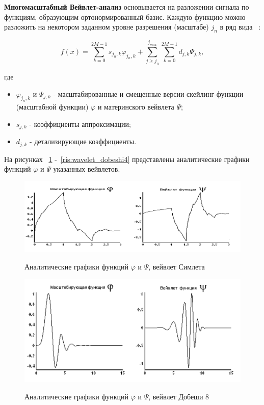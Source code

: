 \documentclass[utf8x, 14pt, oneside, a4paper]{article}
\begin{document}
	{\bf Многомасштабный Вейвлет-анализ} основывается на разложении сигнала по функциям, образующим ортонормированный базис. Каждую функцию можно разложить на некотором заданном уровне разрешения (масштабе) $j_n$ в ряд вида ~\cite{magistr}:
	
	\begin{equation}
		f(x) = \sum_{k=0}^{2M-1}s_{j_n,k}\varphi_{j_n,k}+\sum_{j\geq j_n}^{j_{max}}\sum_{k=0}^{2M-1}d_{j,k}\Psi_{j,k},
	\end{equation}
	
	где
	
	\begin{itemize}
		\item $\varphi_{j_n,k}$ и $\Psi_{j,k}$ - масштабированные и смещенные версии скейлинг-функции (масштабной функции) $\varphi$ и материнского вейвлета $\Psi$;
		\item $s_{j,k}$ - коэффициенты аппроксимации;
		\item $d_{j,k}$ - детализирующие коэффициенты.
	\end{itemize}

	На рисунках ~\ref{ris:wavelet_simlet} -~\ref{ris:wavelet_dobeshi4} представлены аналитические графики функций $\varphi$ и $\Psi$ указанных вейвлетов.
	
	\begin{figure}[h!]
		\begin{center}
			{\includegraphics[scale = 0.9]{img/wavelet_simlet.png}}
		\end{center}
		\caption{Аналитические графики функций $\varphi$ и $\Psi$, вейвлет Симлета}
		\label{ris:wavelet_simlet}
	\end{figure}

	\begin{figure}[h!]
		\begin{center}
			{\includegraphics[scale = 0.7]{img/wavelet_dobeshi8.png}}
		\end{center}
		\caption{Аналитические графики функций $\varphi$ и $\Psi$, вейвлет Добеши 8}
		\label{ris:wavelet_dobeshi8}
	\end{figure}
\end{document}
